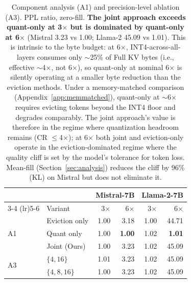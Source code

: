 \documentclass{article}
\begin{document}
\begin{table}[h]
\centering
\caption{Component analysis (A1) and precision-level ablation (A3). PPL ratio, zero-fill.
\textbf{The joint approach exceeds quant-only at 3$\times$ but is dominated by quant-only at 6$\times$} (Mistral 3.23 vs 1.00; Llama-2 45.09 vs 1.01).
This is intrinsic to the byte budget: at 6$\times$, INT4-across-all-layers consumes only $\sim$25\% of Full KV bytes (i.e., effective $\sim$4$\times$, not 6$\times$), so quant-only at nominal 6$\times$ is silently operating at a smaller byte reduction than the eviction methods.
Under a memory-matched comparison (Appendix~\ref{app:memmatched}), quant-only at $\sim$6$\times$ requires evicting tokens beyond the INT4 floor and degrades comparably.
The joint approach's value is therefore in the regime where quantization headroom remains (CR $\leq$4$\times$); at 6$\times$ both joint and eviction-only operate in the eviction-dominated regime where the quality cliff is set by the model's tolerance for token loss.
Mean-fill (Section~\ref{sec:analysis}) reduces the cliff by 96\% (KL) on Mistral but does not eliminate it.}
\label{tab:ablation_components}
\small
\setlength{\tabcolsep}{3pt}
\begin{tabular}{@{}llrrrr@{}}
\toprule
& & \multicolumn{2}{c}{Mistral-7B} & \multicolumn{2}{c}{Llama-2-7B} \\
\cmidrule(lr){3-4} \cmidrule(lr){5-6}
& Variant & 3$\times$ & 6$\times$ & 3$\times$ & 6$\times$ \\
\midrule
\multirow{3}{*}{A1}
& Eviction only & 1.00 & 3.18 & 1.00 & 44.71 \\
& Quant only    & 1.00 & \textbf{1.00} & 1.02 & \textbf{1.01} \\
& Joint (Ours)  & 1.00 & 3.23 & 1.02 & 45.09 \\
\midrule
\multirow{2}{*}{A3}
& $\{4, 16\}$    & 1.01 & 3.23 & 1.02 & 45.09 \\
& $\{4, 8, 16\}$ & 1.00 & 3.23 & 1.02 & 45.09 \\
\bottomrule
\end{tabular}
\end{table}
\end{document}

